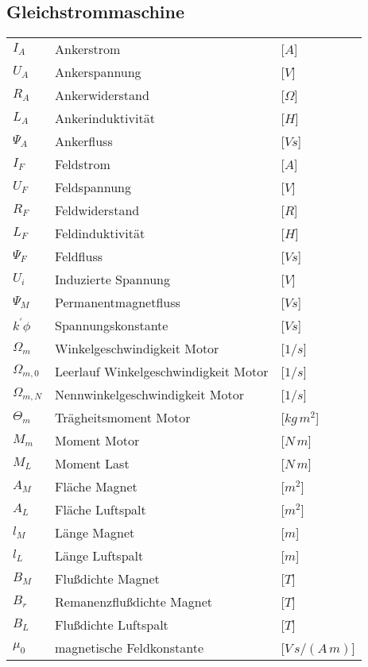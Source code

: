 \subsection{Gleichstrommaschine}
\begin{tabular}{L{2cm}lR{2cm}}
	$I_A$  &Ankerstrom  &[$A$]\\
	$U_A$ &Ankerspannung & [$V$]\\
	$R_A$  &Ankerwiderstand &[$ \Omega $] \\
	$L_A$  &Ankerinduktivität &[$H$]\\
	$\Psi_A$ &Ankerfluss & [$Vs$]\\
	$I_F$ & Feldstrom & [$A$]\\
	$U_F$ & Feldspannung & [$V$]\\
	$R_F$ & Feldwiderstand & [$R$]\\
	$L_F$ & Feldinduktivität & [$H$]\\
	$\Psi_F$ &Feldfluss & [$Vs$]\\
	$U_i$ &Induzierte Spannung & [$V$]\\
	$\Psi_M$ &Permanentmagnetfluss & [$Vs$]\\
	$k^{'} \phi$ &Spannungskonstante & [$Vs$]\\
	$\Omega_m$ &Winkelgeschwindigkeit Motor & [$1/s$]\\
	$\Omega_{m,0}$ &Leerlauf Winkelgeschwindigkeit Motor & [$1/s$]\\
	$\Omega_{m,N}$ &Nennwinkelgeschwindigkeit Motor & [$1/s$]\\
	$\Theta_m$ &Trägheitsmoment Motor & [$kg \, m^{2}$]\\
	$M_m$ &Moment Motor & [$N\,m$]\\
	$M_L$ &Moment Last & [$N\,m$]\\
	$A_M$ &Fläche Magnet & [$m^{2}$]\\
	$A_L$ &Fläche Luftspalt & [$m^{2}$]\\
	$l_M$ &Länge Magnet & [$m$]\\
	$l_L$ &Länge Luftspalt & [$m$]\\
	$B_M$ &Flußdichte Magnet & [$T$]\\
	$B_r$ &Remanenzflußdichte Magnet & [$T$]\\
	$B_L$ &Flußdichte Luftspalt & [$T$]\\
	$\mu_0$ &magnetische Feldkonstante & [$V\,s/ (A \, m)$]\\
\end{tabular}\\
